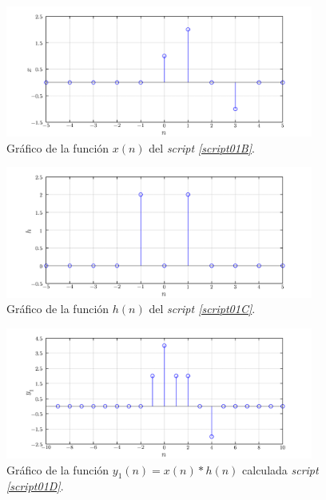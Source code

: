 \documentclass[a4paper,12pt,final]{article}
\begin{document}
      \begin{figure}[H]
        \caption{Gráfico de la función $x\left(n\right)$ del \emph{script \ref{script01B}}.}
        \label{script01Bfigure}
        \includegraphics[width=0.90\textwidth]{./laboratorio_3/problema01_x.png}
      \end{figure}

      \begin{figure}[H]
        \caption{Gráfico de la función $h\left(n\right)$ del \emph{script \ref{script01C}}.}
        \label{script01Cfigure}
        \includegraphics[width=0.90\textwidth]{./laboratorio_3/problema01_h.png}
      \end{figure}

      \begin{figure}[H]
        \caption{Gráfico de la función $y_1\left(n\right)=x\left(n\right)*h\left(n\right)$ calculada \emph{script \ref{script01D}}.}
        \label{script01Dfigure}
        \includegraphics[width=0.90\textwidth]{./laboratorio_3/problema01_y1.png}
      \end{figure}
\end{document}
